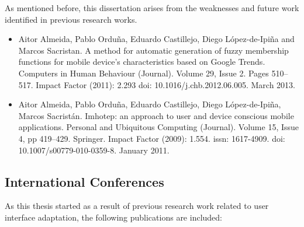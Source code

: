 As mentioned before, this dissertation arises from the weaknesses and future work
identified in previous research works. 

\begin{itemize}
  \item Aitor Almeida, Pablo Orduña, Eduardo Castillejo, Diego {López-de-Ipiña} 
  and Marcos Sacristan. A method for automatic generation of fuzzy membership 
  functions for mobile device’s characteristics based on Google Trends. 
  Computers in Human Behaviour (Journal). Volume 29, Issue 2. Pages 510–517. 
  Impact Factor (2011): 2.293 \acs{doi}: 10.1016/j.chb.2012.06.005. March 2013.
  
  \item Aitor Almeida, Pablo Orduña, Eduardo Castillejo, Diego {López-de-Ipiña}, 
  Marcos Sacristán. Imhotep: an approach to user and device conscious mobile 
  applications. Personal and Ubiquitous Computing (Journal). Volume 15, Issue 
  4, pp 419–429. Springer. Impact Factor (2009): 1.554. \acs{issn}: 1617-4909. 
  \acs{doi}: 10.1007/s00779-010-0359-8. January 2011.
\end{itemize}


\subsection{International Conferences}

As this thesis started as a result of previous research work related to user 
interface adaptation, the following publications are included:

